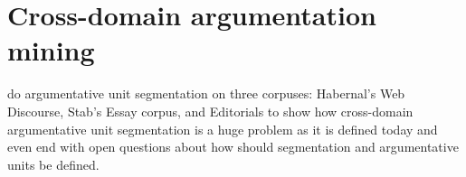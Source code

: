 \documentclass[a4paper,10pt]{article}
\begin{document}
\section{Cross-domain argumentation mining}

\cite{Ajjour2017} do argumentative unit segmentation on three corpuses:
Habernal's Web Discourse, Stab's Essay corpus, and Editorials to show
how cross-domain argumentative unit segmentation is a huge problem as it
is defined today and even end with open questions about how should
segmentation and argumentative units be defined. 



\end{document}
